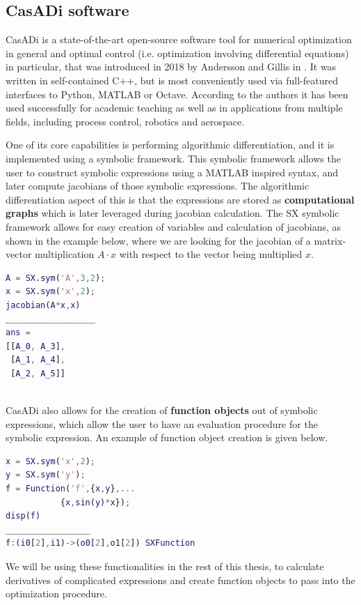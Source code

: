 \documentclass[12pt, a4paper]{article}
\begin{document}
\subsection{CasADi software}
CasADi is a state-of-the-art open-source software tool for numerical optimization in general and optimal control (i.e. optimization involving differential equations) in particular, that was introduced in 2018 by Andersson and Gillis in \cite{Andersson2018}. It was written in self-contained C++, but is most conveniently used via full-featured interfaces to Python, MATLAB or Octave. According to the authors it has been used successfully for academic teaching as well as in applications from multiple fields, including process control, robotics and aerospace.\par
One of its core capabilities is performing algorithmic differentiation, and it is implemented using a symbolic framework. This symbolic framework allows the user to construct symbolic expressions using a MATLAB inspired syntax, and later compute jacobians of those symbolic expressions. The algorithmic differentiation aspect of this is that the expressions are stored as \textbf{computational graphs} which is later leveraged during jacobian calculation. The SX symbolic framework allows for easy creation of variables and calculation of jacobians, as shown in the example below, where we are looking for the jacobian of a matrix-vector multiplication $A\cdot x$ with respect to the vector being multiplied $x$.\par
\begin{lstlisting}[language=MATLAB]
A = SX.sym('A',3,2);
x = SX.sym('x',2);
jacobian(A*x,x)
__________________
ans =
[[A_0, A_3], 
 [A_1, A_4], 
 [A_2, A_5]]
 
\end{lstlisting}
CasADi also allows for the creation of \textbf{function objects} out of symbolic expressions, which allow the user to have an evaluation procedure for the symbolic expression. An example of function object creation is given below.
\begin{lstlisting}[language=MATLAB]
x = SX.sym('x',2);
y = SX.sym('y');
f = Function('f',{x,y},...
           {x,sin(y)*x});
disp(f)
_________________
f:(i0[2],i1)->(o0[2],o1[2]) SXFunction

\end{lstlisting}
We will be using these functionalities in the rest of this thesis, to calculate derivatives of complicated expressions and create function objects to pass into the optimization procedure.
\end{document}
